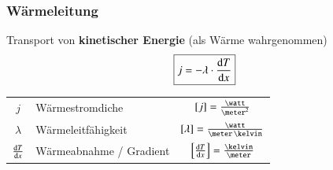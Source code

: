 \subsubsection{Wärmeleitung}
Transport von \textbf{kinetischer Energie} (als Wärme wahrgenommen) \\

$$ \boxed{ j = - \lambda \cdot \frac{\mathop{} \! \mathrm{d} T}{\mathop{} \! \mathrm{d} x}  } $$ 

\renewcommand{\arraystretch}{1.3}
\begin{tabular}{c l c}
	$j$ 						& Wärmestromdiche 			& $[j] = \frac{\watt}{\meter^2}$ 								\\
	$\lambda$ 					& Wärmeleitfähigkeit 		& $[\lambda] = \frac{\watt}{\meter \, \kelvin}$ 				\\
	$\frac{\mathop{} \! \mathrm{d} T}{\mathop{} \! \mathrm{d} x}$ 	& Wärmeabnahme / Gradient 	& $ \Big[\frac{\diff T}{\diff x} \Big] = \frac{\kelvin}{\meter}$	\\
\end{tabular}
\renewcommand{\arraystretch}{1}


